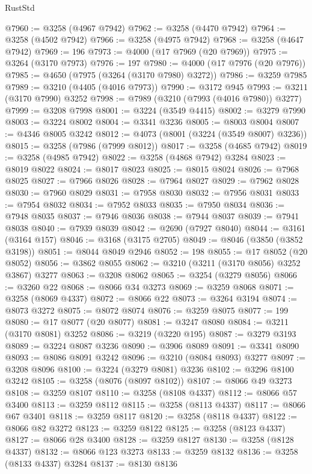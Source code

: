 \begin{lexlean}{RustStd}
\begin{coremodule}
@7960 := @3258 (@4967 @7942)
@7962 := @3258 (@4470 @7942)
@7964 := @3258 (@4502 @7942)
@7966 := @3258 (@4975 @7942)
@7968 := @3258 (@4647 @7942)
@7969 := 196
@7973 := @4000 (@17 @7969 (@20 @7969))
@7975 := @3264 (@3170 @7973)
@7976 := 197
@7980 := @4000 (@17 @7976 (@20 @7976))
@7985 := @4650 (@7975 (@3264 (@3170 @7980) @3272))
@7986 := @3259 @7985
@7989 := @3210 (@4405 (@4016 @7973))
@7990 := @3172 @945
@7993 := @3211 (@3170 @7990) @3252
@7998 := @7989 (@3210 (@7993 (@4016 @7980)) @3277)
@7999 := @3208 @7998
@8001 := @3224 (@3549 @4415)
@8002 := @3279 @7990
@8003 := @3224 @8002
@8004 := @3341 @3236
@8005 := @8003 @8004
@8007 := @4346 @8005 @3242
@8012 := @4073 (@8001 (@3224 (@3549 @8007) @3236))
@8015 := @3258 (@7986 (@7999 @8012))
@8017 := @3258 (@4685 @7942)
@8019 := @3258 (@4985 @7942)
@8022 := @3258 (@4868 @7942) @3284
@8023 := @8019 @8022
@8024 := @8017 @8023
@8025 := @8015 @8024
@8026 := @7968 @8025
@8027 := @7966 @8026
@8028 := @7964 @8027
@8029 := @7962 @8028
@8030 := @7960 @8029
@8031 := @7958 @8030
@8032 := @7956 @8031
@8033 := @7954 @8032
@8034 := @7952 @8033
@8035 := @7950 @8034
@8036 := @7948 @8035
@8037 := @7946 @8036
@8038 := @7944 @8037
@8039 := @7941 @8038
@8040 := @7939 @8039
@8042 := @2690 (@7927 @8040)
@8044 := @3161 (@3164 @157)
@8046 := @3168 (@3175 @2705)
@8049 := @8046 (@3850 (@3852 @3198))
@8051 := @8044 @8049 @2946
@8052 := 198
@8055 := @17 @8052 (@20 @8052)
@8056 := @3862 @8055
@8062 := @3210 (@3211 (@3170 @8056) @3252 @3867) @3277
@8063 := @3208 @8062
@8065 := @3254 (@3279 @8056)
@8066 := @3260 @22
@8068 := @8066 @34 @3273
@8069 := @3259 @8068
@8071 := @3258 (@8069 @4337)
@8072 := @8066 @22
@8073 := @3264 @3194
@8074 := @8073 @3272
@8075 := @8072 @8074
@8076 := @3259 @8075
@8077 := 199
@8080 := @17 @8077 (@20 @8077)
@8081 := @3247 @8080
@8084 := @3211 (@3170 @8081) @3252
@8086 := @3219 (@3220 @195)
@8087 := @3279 @3193
@8089 := @3224 @8087 @3236
@8090 := @3906 @8089
@8091 := @3341 @8090
@8093 := @8086 @8091 @3242
@8096 := @3210 (@8084 @8093) @3277
@8097 := @3208 @8096
@8100 := @3224 (@3279 @8081) @3236
@8102 := @3296 @8100 @3242
@8105 := @3258 (@8076 (@8097 @8102))
@8107 := @8066 @49 @3273
@8108 := @3259 @8107
@8110 := @3258 (@8108 @4337)
@8112 := @8066 @57 @3400
@8113 := @3259 @8112
@8115 := @3258 (@8113 @4337)
@8117 := @8066 @67 @3401
@8118 := @3259 @8117
@8120 := @3258 (@8118 @4337)
@8122 := @8066 @82 @3272
@8123 := @3259 @8122
@8125 := @3258 (@8123 @4337)
@8127 := @8066 @28 @3400
@8128 := @3259 @8127
@8130 := @3258 (@8128 @4337)
@8132 := @8066 @123 @3273
@8133 := @3259 @8132
@8136 := @3258 (@8133 @4337) @3284
@8137 := @8130 @8136

\end{coremodule}
\end{lexlean}
